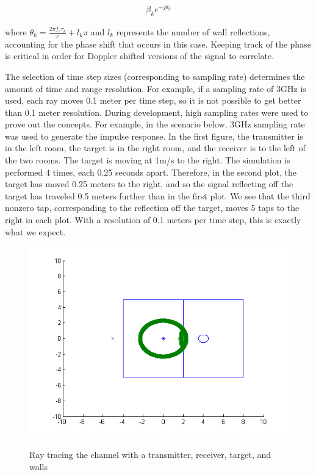 \documentclass[article,11pt,onecolumn,final]{IEEEtran}
\begin{document}
\begin{align*}
\beta_{k} e^{-j \theta_k}
\end{align*}

where $\theta_k=\frac{2 \pi f_c \tau_k}{c} + l_k \pi$
and $l_k$ represents the number of wall reflections, accounting for the phase shift that occurs in this case. Keeping track of the phase is critical in order for Doppler shifted versions of the signal to correlate.

The selection of time step sizes (corresponding to sampling rate) determines the amount of time and range resolution. For example, if a sampling rate of 3GHz is used, each ray moves 0.1 meter per time step, so it is not possible to get better than 0.1 meter resolution. During development, high sampling rates were used to prove out the concepts. For example, in the scenario below, 3GHz sampling rate was used to generate the impulse response. In the first figure, the transmitter is in the left room, the target is in the right room, and the receiver is to the left of the two rooms. The target is moving at 1m/s to the right. The simulation is performed 4 times, each 0.25 seconds apart. Therefore, in the second plot, the target has moved 0.25 meters to the right, and so the signal reflecting off the target has traveled 0.5 meters further than in the first plot. We see that the third nonzero tap, corresponding to the reflection off the target, moves 5 taps to the right in each plot. With a resolution of 0.1 meters per time step, this is exactly what we expect.

\begin{figure}[H]
\caption{Ray tracing the channel with a transmitter, receiver, target, and walls}
\centering
\includegraphics[width=400pt]{sim/simulation.png}  \\
\label{fig:Ray Tracing Channel}
\end{figure}
\end{document}
